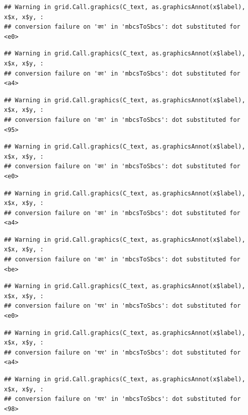 \documentclass[
]{article}
\begin{document}
\begin{verbatim}
## Warning in grid.Call.graphics(C_text, as.graphicsAnnot(x$label), x$x, x$y, :
## conversion failure on 'का' in 'mbcsToSbcs': dot substituted for <e0>
\end{verbatim}

\begin{verbatim}
## Warning in grid.Call.graphics(C_text, as.graphicsAnnot(x$label), x$x, x$y, :
## conversion failure on 'का' in 'mbcsToSbcs': dot substituted for <a4>
\end{verbatim}

\begin{verbatim}
## Warning in grid.Call.graphics(C_text, as.graphicsAnnot(x$label), x$x, x$y, :
## conversion failure on 'का' in 'mbcsToSbcs': dot substituted for <95>
\end{verbatim}

\begin{verbatim}
## Warning in grid.Call.graphics(C_text, as.graphicsAnnot(x$label), x$x, x$y, :
## conversion failure on 'का' in 'mbcsToSbcs': dot substituted for <e0>
\end{verbatim}

\begin{verbatim}
## Warning in grid.Call.graphics(C_text, as.graphicsAnnot(x$label), x$x, x$y, :
## conversion failure on 'का' in 'mbcsToSbcs': dot substituted for <a4>
\end{verbatim}

\begin{verbatim}
## Warning in grid.Call.graphics(C_text, as.graphicsAnnot(x$label), x$x, x$y, :
## conversion failure on 'का' in 'mbcsToSbcs': dot substituted for <be>
\end{verbatim}

\begin{verbatim}
## Warning in grid.Call.graphics(C_text, as.graphicsAnnot(x$label), x$x, x$y, :
## conversion failure on 'घर' in 'mbcsToSbcs': dot substituted for <e0>
\end{verbatim}

\begin{verbatim}
## Warning in grid.Call.graphics(C_text, as.graphicsAnnot(x$label), x$x, x$y, :
## conversion failure on 'घर' in 'mbcsToSbcs': dot substituted for <a4>
\end{verbatim}

\begin{verbatim}
## Warning in grid.Call.graphics(C_text, as.graphicsAnnot(x$label), x$x, x$y, :
## conversion failure on 'घर' in 'mbcsToSbcs': dot substituted for <98>
\end{verbatim}
\end{document}
